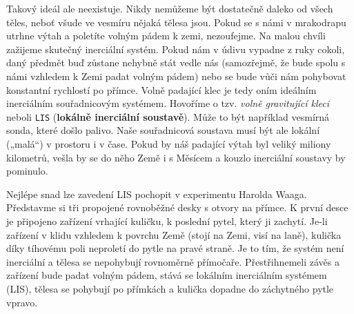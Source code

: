       Takový ideál ale neexistuje. Nikdy nemůžeme být dostatečně daleko od všech těles, neboť všude
      ve vesmíru nějaká tělesa jsou. Pokud se s námi v mrakodrapu utrhne výtah a poletíte volným
      pádem k zemi, nezoufejme. Na malou chvíli zažijeme skutečný inerciální systém. Pokud nám v
      údivu vypadne z ruky cokoli, daný předmět buď zůstane nehybně stát vedle nás (samozřejmě, že
      bude spolu s námi vzhledem k Zemi padat volným pádem) nebo se bude vůči nám pohybovat
      konstantní rychlostí po přímce. Volně padající klec je tedy oním ideálním inerciálním
      souřadnicovým systémem. Hovoříme o tzv. \emph{volně gravitující kleci} neboli \texttt{LIS}
      (\textbf{lokálně inerciální soustavě}). Může to být například vesmírná sonda, které došlo
      palivo. Naše souřadnicová soustava musí být ale lokální („malá“) v prostoru i v čase. Pokud by
      náš padající výtah byl veliký miliony kilometrů, vešla by se do něho Země i s Měsícem a kouzlo
      inerciální soustavy by pominulo.


      Nejlépe snad lze zavedení LIS pochopit v experimentu Harolda Waaga. Představme si tři
      propojené rovnoběžné desky s otvory na přímce. K první desce je připojeno zařízení vrhající
      kuličku, k poslední pytel, který ji zachytí. Je-li zařízení v klidu vzhledem k povrchu Země
      (stojí na Zemi, visí na laně), kulička díky tíhovému poli neproletí do pytle na pravé straně.
      Je to tím, že systém není inerciální a tělesa se nepohybují rovnoměrně přímočaře.
      Přestřihnemeli závěs a zařízení bude padat volným pádem, stává se lokálním inerciálním
      systémem (LIS), tělesa se pohybují po přímkách a kulička dopadne do záchytného pytle vpravo. 

